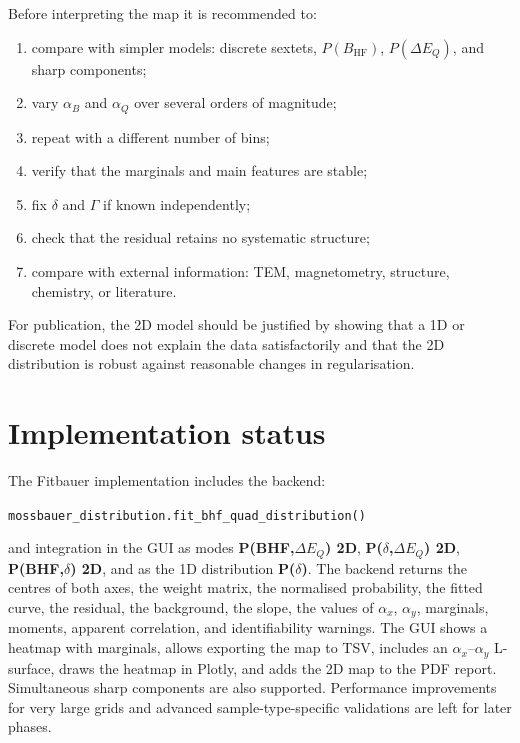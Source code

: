 \documentclass[11pt,a4paper]{article}
\newcommand{\BHF}{B_{\mathrm{HF}}}
\newcommand{\DEQ}{\Delta E_Q}
\begin{document}
Before interpreting the map it is recommended to:
\begin{enumerate}
  \item compare with simpler models: discrete sextets, $P(\BHF)$,
  $P(\DEQ)$, and sharp components;
  \item vary $\alpha_B$ and $\alpha_Q$ over several orders of magnitude;
  \item repeat with a different number of bins;
  \item verify that the marginals and main features are stable;
  \item fix $\delta$ and $\Gamma$ if known independently;
  \item check that the residual retains no systematic structure;
  \item compare with external information: TEM, magnetometry, structure,
  chemistry, or literature.
\end{enumerate}
For publication, the 2D model should be justified by showing that a 1D or
discrete model does not explain the data satisfactorily and that the 2D
distribution is robust against reasonable changes in regularisation.

\section{Implementation status}

The Fitbauer implementation includes the backend:
\begin{center}
\texttt{mossbauer\_distribution.fit\_bhf\_quad\_distribution()}
\end{center}
and integration in the GUI as modes \textbf{P(BHF,$\DEQ$) 2D},
\textbf{P($\delta$,$\DEQ$) 2D}, \textbf{P(BHF,$\delta$) 2D}, and as the
1D distribution \textbf{P($\delta$)}. The backend returns the centres of both
axes, the weight matrix, the normalised probability, the fitted curve, the
residual, the background, the slope, the values of $\alpha_x$, $\alpha_y$,
marginals, moments, apparent correlation, and identifiability warnings. The GUI
shows a heatmap with marginals, allows exporting the map to TSV, includes an
$\alpha_x$--$\alpha_y$ L-surface, draws the heatmap in Plotly, and adds the 2D
map to the PDF report. Simultaneous sharp components are also supported.
Performance improvements for very large grids and advanced sample-type-specific
validations are left for later phases.
\end{document}

